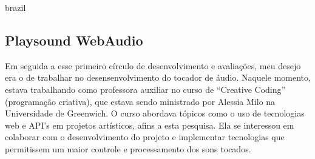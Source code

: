 \begin{otherlanguage*}{brazil}







\subsection{Playsound WebAudio}

Em seguida a esse primeiro círculo de desenvolvimento e avaliações, meu desejo era o de trabalhar no desensenvolvimento do tocador de áudio. Naquele momento, estava trabalhando como professora auxiliar no curso de ``Creative Coding'' (programação criativa), que estava sendo ministrado por Alessia Milo na Universidade de Greenwich. O curso abordava tópicos como o uso de tecnologias web e API's em projetos artísticos, afins a
 esta pesquisa. Ela se interessou em colaborar com o desenvolvimento do projeto e implementar tecnologias que permitissem um maior controle e processamento dos sons tocados.


\end{otherlanguage*}
